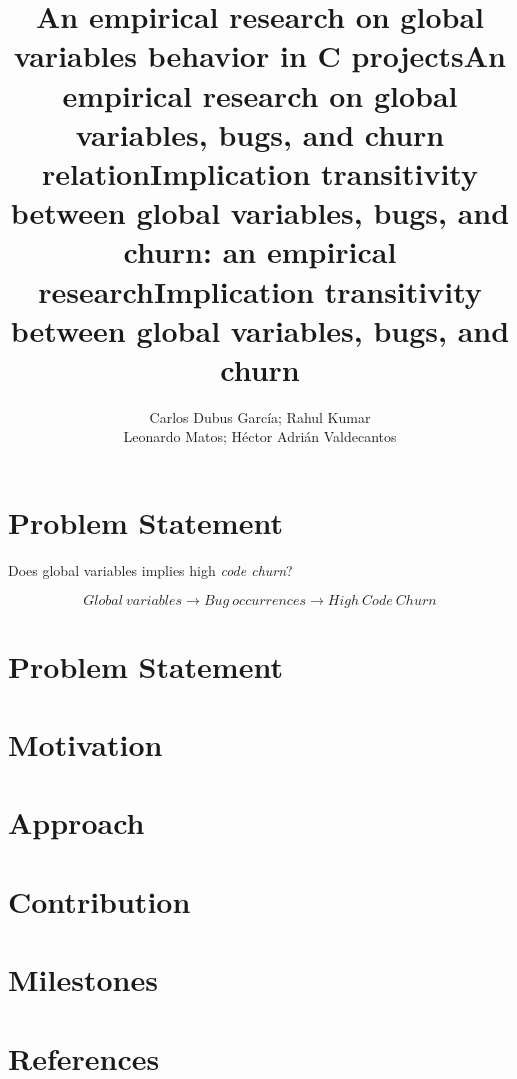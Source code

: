 \documentclass[a4paper,12pt]{article}
\begin{document}
\title{An empirical research on global variables behavior in C projects}
\title{An empirical research on global variables, bugs, and churn relation}
\title{Implication transitivity between global variables, bugs,  and churn: an empirical research}
\title{Implication transitivity between global variables, bugs,  and churn}
\author{Carlos Dubus Garc\'{i}a; Rahul Kumar\\
Leonardo Matos;
H\'{e}ctor Adri\'{a}n Valdecantos}

\maketitle

\section{Problem Statement}
Does global variables implies high \emph{code churn}?

\[ Global\ variables \to Bug\ occurrences \to High\ Code\ Churn \]

\section{Problem Statement}


\section{Motivation}


\section{Approach}


\section{Contribution}


\section{Milestones}


\section{References}
\end{document}
